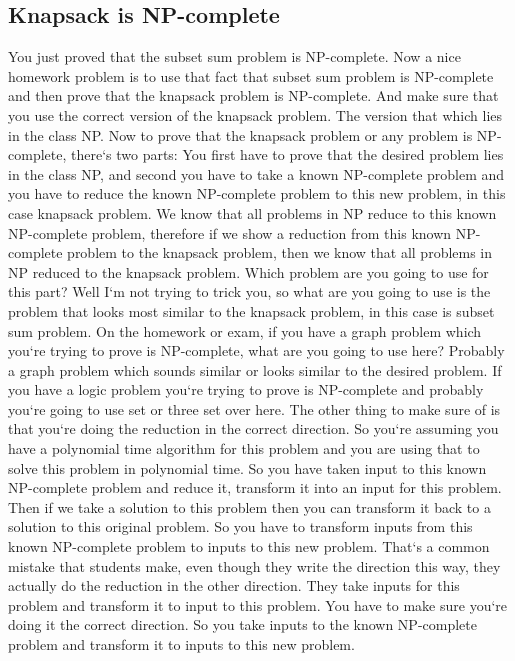 \subsection{Knapsack is NP-complete}
You just proved that the subset sum problem is NP-complete.
Now a nice homework problem is to use that fact that subset sum problem is NP-complete and then prove that the knapsack problem is NP-complete.
And make sure that you use the correct version of the knapsack problem.
The version that which lies in the class NP\@.
Now to prove that the knapsack problem or any problem is NP-complete, there`s two parts: You first have to prove that the desired problem lies in the class NP, and second you have to take a known NP-complete problem and you have to reduce the known NP-complete problem to this new problem, in this case knapsack problem.
We know that all problems in NP reduce to this known NP-complete problem, therefore if we show a reduction from this known NP-complete problem to the knapsack problem, then we know that all problems in NP reduced to the knapsack problem.
Which problem are you going to use for this part? Well I`m not trying to trick you, so what are you going to use is the problem that looks most similar to the knapsack problem, in this case is subset sum problem.
On the homework or exam, if you have a graph problem which you`re trying to prove is NP-complete, what are you going to use here? Probably a graph problem which sounds similar or looks similar to the desired problem.
If you have a logic problem you`re trying to prove is NP-complete and probably you`re going to use set or three set over here.
The other thing to make sure of is that you`re doing the reduction in the correct direction.
So you`re assuming you have a polynomial time algorithm for this problem and you are using that to solve this problem in polynomial time.
So you have taken input to this known NP-complete problem and reduce it, transform it into an input for this problem.
Then if we take a solution to this problem then you can transform it back to a solution to this original problem.
So you have to transform inputs from this known NP-complete problem to inputs to this new problem.
That`s a common mistake that students make, even though they write the direction this way, they actually do the reduction in the other direction.
They take inputs for this problem and transform it to input to this problem.
You have to make sure you`re doing it the correct direction.
So you take inputs to the known NP-complete problem and transform it to inputs to this new problem.

